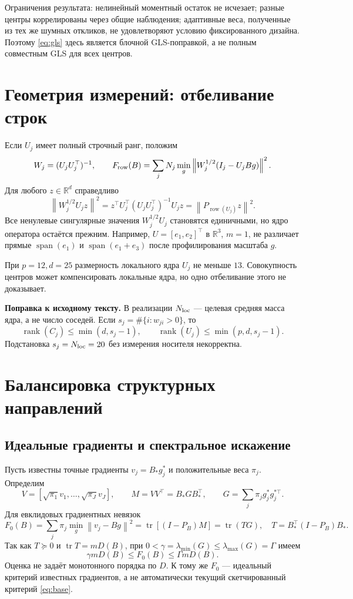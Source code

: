 \documentclass[11pt,a4paper]{article}
\newcommand{\R}{\mathbb R}
\newcommand{\norm}[1]{\left\lVert#1\right\rVert}
\newcommand{\tr}{\operatorname{tr}}
\newcommand{\rank}{\operatorname{rank}}
\begin{document}
Ограничения результата: нелинейный моментный остаток не исчезает;
разные центры коррелированы через общие наблюдения; адаптивные веса,
полученные из тех же шумных откликов, не удовлетворяют условию
фиксированного дизайна. Поэтому \eqref{eq:gls} здесь является блочной
GLS-поправкой, а не полным совместным GLS для всех центров.

\section{Геометрия измерений: отбеливание строк}
Если $U_j$ имеет полный строчный ранг, положим
\begin{equation}\label{eq:row}
 W_j=(U_jU_j^\top)^{-1},\qquad
 F_{\rm row}(B)=\sum_jN_j\min_g\norm{W_j^{1/2}(I_j-U_jBg)}^2.
\end{equation}
Для любого $z\in\R^d$ справедливо
\begin{equation}\label{eq:rowprojector}
 \norm{W_j^{1/2}U_jz}^2
 =z^\top U_j^\top(U_jU_j^\top)^{-1}U_jz
 =\norm{P_{\operatorname{row}(U_j)}z}^2.
\end{equation}
Все ненулевые сингулярные значения $W_j^{1/2}U_j$ становятся единичными,
но ядро оператора остаётся прежним. Например, $U=[e_1,e_2]^\top$ в
$\R^3$, $m=1$, не различает прямые $\operatorname{span}(e_1)$ и
$\operatorname{span}(e_1+e_3)$ после профилирования масштаба $g$.

При $p=12,d=25$ размерность локального ядра $U_j$ не меньше $13$.
Совокупность центров может компенсировать локальные ядра, но одно
отбеливание этого не доказывает.

\textbf{Поправка к исходному тексту.} В реализации $N_{\rm loc}$ ---
целевая средняя масса ядра, а не число соседей. Если
$s_j=\#\{i:w_{ji}>0\}$, то
\[
 \rank(C_j)\le\min(d,s_j-1),\qquad
 \rank(U_j)\le\min(p,d,s_j-1).
\]
Подстановка $s_j=N_{\rm loc}=20$ без измерения носителя некорректна.

\section{Балансировка структурных направлений}
\subsection{Идеальные градиенты и спектральное искажение}
Пусть известны точные градиенты $v_j=B_*g_j^*$ и положительные веса
$\pi_j$. Определим
\[
 V=[\sqrt{\pi_1}v_1,\ldots,\sqrt{\pi_J}v_J],\qquad
 M=VV^\top=B_*GB_*^\top,\qquad
 G=\sum_j\pi_jg_j^*g_j^{*\top}.
\]
Для евклидовых градиентных невязок
\[
 F_0(B)=\sum_j\pi_j\min_g\norm{v_j-Bg}^2
 =\tr[(I-P_B)M]=\tr(TG),\quad
 T=B_*^\top(I-P_B)B_*.
\]
Так как $T\succeq0$ и $\tr T=mD(B)$, при
$0<\gamma=\lambda_{\min}(G)\le\lambda_{\max}(G)=\Gamma$ имеем
\begin{equation}\label{eq:bounds}
 \gamma mD(B)\le F_0(B)\le\Gamma mD(B).
\end{equation}
Оценка не задаёт монотонного порядка по $D$. К тому же $F_0$ ---
идеальный критерий известных градиентов, а не автоматически текущий
скетчированный критерий \eqref{eq:base}.
\end{document}
